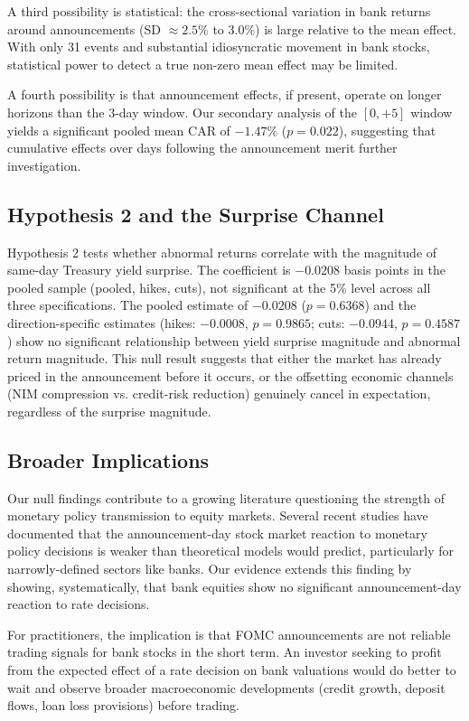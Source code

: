 \documentclass[11pt]{article}
\begin{document}
A third possibility is statistical: the cross-sectional variation in bank returns around announcements (SD $\approx 2.5\%$ to $3.0\%$) is large relative to the mean effect. With only 31 events and substantial idiosyncratic movement in bank stocks, statistical power to detect a true non-zero mean effect may be limited.

A fourth possibility is that announcement effects, if present, operate on longer horizons than the 3-day window. Our secondary analysis of the $[0, +5]$ window yields a significant pooled mean CAR of $-1.47\%$ ($p = 0.022$), suggesting that cumulative effects over days following the announcement merit further investigation.

\subsection{Hypothesis 2 and the Surprise Channel}\label{sec:h2_interpretation}

Hypothesis 2 tests whether abnormal returns correlate with the magnitude of same-day Treasury yield surprise. The coefficient is $-0.0208$ basis points in the pooled sample (pooled, hikes, cuts), not significant at the 5\% level across all three specifications. The pooled estimate of $-0.0208$ ($p = 0.6368$) and the direction-specific estimates (hikes: $-0.0008$, $p = 0.9865$; cuts: $-0.0944$, $p = 0.4587$) show no significant relationship between yield surprise magnitude and abnormal return magnitude. This null result suggests that either the market has already priced in the announcement before it occurs, or the offsetting economic channels (NIM compression vs. credit-risk reduction) genuinely cancel in expectation, regardless of the surprise magnitude.

\subsection{Broader Implications}

Our null findings contribute to a growing literature questioning the strength of monetary policy transmission to equity markets. Several recent studies have documented that the announcement-day stock market reaction to monetary policy decisions is weaker than theoretical models would predict, particularly for narrowly-defined sectors like banks. Our evidence extends this finding by showing, systematically, that bank equities show no significant announcement-day reaction to rate decisions.

For practitioners, the implication is that FOMC announcements are not reliable trading signals for bank stocks in the short term. An investor seeking to profit from the expected effect of a rate decision on bank valuations would do better to wait and observe broader macroeconomic developments (credit growth, deposit flows, loan loss provisions) before trading.
\end{document}
